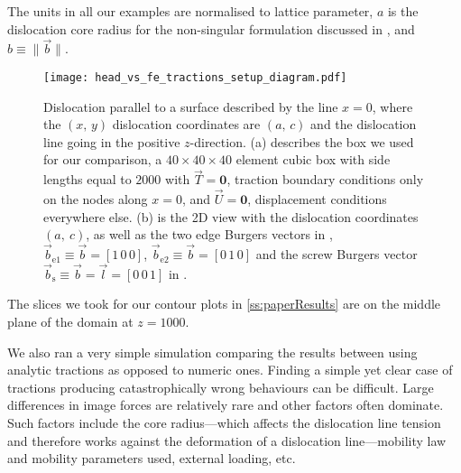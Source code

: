 The units in all our examples are normalised to lattice parameter, $a$ is the dislocation core radius for the non-singular formulation discussed in \cite{a_non-singular_continuum_theory_of_dislocations}, and $b \equiv \lVert \vec{b} \rVert$.

\begin{figure}
    \centering
    \texttt{[image: head\_vs\_fe\_tractions\_setup\_diagram.pdf]}
    \caption[Set up comparing infinite-domain, singular solutions of stress fields to those obtained via a non-singular formulation with analytic and numeric tractions coupled to FEM.]{Dislocation parallel to a surface described by the line $x = 0$, where the $(x,\,y)$ dislocation coordinates are $(a,\,c)$ and the dislocation line going in the positive $z$-direction. (a) describes the box we used for our comparison, a  $40 \times 40 \times 40$ element cubic box with side lengths equal to $2000$ with $\vec{T} = \bm{0}$, traction boundary conditions only on the nodes along $x = 0$, and $\vec{U} = \bm{0}$, displacement conditions everywhere else. (b) is the 2D view with the dislocation coordinates $(a,~c)$, as well as the two edge Burgers vectors in \cite{head1953edge}, $\vec{b}_\textrm{e1} \equiv \vec{b} = [1\, 0\, 0]$, $\vec{b}_\textrm{e2} \equiv \vec{b} = [0\, 1\, 0]$ and the screw Burgers vector $\vec{b}_\textrm{s} \equiv \vec{b} = \vec{l} = [0\, 0\, 1] $ in \cite[p.~59,~64]{hirth1983theory}.}
    \label{f:headvstractionfem}
\end{figure}

The slices we took for our contour plots in \cref{ss:paperResults} are on the middle plane of the domain at $z = 1000$.

We also ran a very simple simulation comparing the results between using analytic tractions as opposed to numeric ones. Finding a simple yet clear case of tractions producing catastrophically wrong behaviours can be difficult. Large differences in image forces are relatively rare and other factors often dominate. Such factors include the core radius---which affects the dislocation line tension and therefore works against the deformation of a dislocation line---mobility law and mobility parameters used, external loading, etc.

